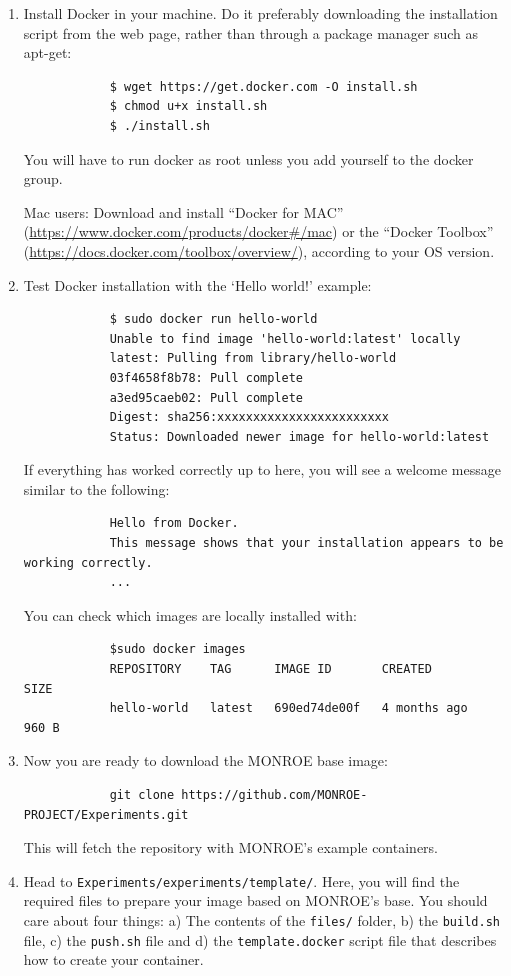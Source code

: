\documentclass[a4paper,10pt]{article}
\newcommand{\VerbatimFont}{\footnotesize}
\newcommand{\monroe}{MONROE}
\newcommand{\identifier}[1]{{\texttt{\small{#1}}}}
\begin{document}
\begin{enumerate}
	\item Install Docker in your machine. Do it preferably downloading the installation script  from the web page, rather than through a package manager such as apt-get:
		{\VerbatimFont\begin{verbatim}
			$ wget https://get.docker.com -O install.sh
			$ chmod u+x install.sh
			$ ./install.sh
		\end{verbatim}}
		You will have to run docker as root unless you add yourself to the docker group.

		Mac users: Download and install ``Docker for MAC'' (\url{https://www.docker.com/products/docker#/mac}) or the ``Docker Toolbox'' (\url{https://docs.docker.com/toolbox/overview/}), according to your OS version.
	\item Test Docker installation with the `Hello world!' example:
		{\VerbatimFont\begin{verbatim}
			$ sudo docker run hello-world
			Unable to find image 'hello-world:latest' locally
			latest: Pulling from library/hello-world
			03f4658f8b78: Pull complete
			a3ed95caeb02: Pull complete
			Digest: sha256:xxxxxxxxxxxxxxxxxxxxxxxx
			Status: Downloaded newer image for hello-world:latest
		\end{verbatim}}
		If everything has worked correctly up to here, you will see a welcome message similar to the following:
		{\VerbatimFont\begin{verbatim}
			Hello from Docker.
			This message shows that your installation appears to be working correctly.
			...
		\end{verbatim}}
		You can check which images are locally installed with:
		{\VerbatimFont\begin{verbatim}
			$sudo docker images
			REPOSITORY    TAG      IMAGE ID       CREATED        SIZE
			hello-world   latest   690ed74de00f   4 months ago   960 B
		\end{verbatim}}
  \item Now you are ready to download the \monroe{} base image:
		{\VerbatimFont\begin{verbatim}
			git clone https://github.com/MONROE-PROJECT/Experiments.git
		\end{verbatim}}
		This will fetch the repository with \monroe{}'s example containers.
	\item Head to \identifier{Experiments/experiments/template/}.
		Here, you will find the required files to prepare your image based on \monroe{}'s base.
		You should care about four things: a) The contents of the \identifier{files/} folder, b) the \identifier{build.sh} file, c) the \identifier{push.sh} file and d) the \identifier{template.docker} script file that describes how to create your container.

\end{enumerate}
\end{document}
